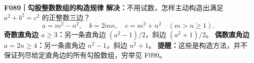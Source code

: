 \textbf{F089｜勾股整数数组的构造规律}
\textbf{解决：}不用试数，怎样主动构造出满足 $a^2+b^2=c^2$ 的正整数三边？
\[\boxed{a=m^2-n^2,\quad b=2mn,\quad c=m^2+n^2}\quad(m>n\ge1).\]
\textbf{奇数直角边 $a\ge3$：}另一条直角边 $(a^2-1)/2$，斜边 $(a^2+1)/2$。
\textbf{偶数直角边 $a=2n\ge4$：}另一条直角边 $n^2-1$，斜边 $n^2+1$。
\textbf{提醒：}这些是构造方法，并不保证列尽给定直角边的所有勾股数组，穷举见 F090。
